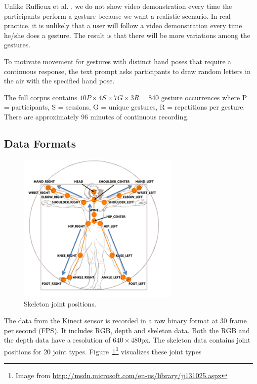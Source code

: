 Unlike Ruffieux et al. \cite{Ruffieux2013}, we do not show video demonstration
every time the participants perform a gesture because we want a
realistic scenario. In real practice, it is unlikely that a user will follow a
video demonstration every time he/she does a gesture. The result is that
there will be more variations among the gestures.

To motivate movement for gestures with distinct hand poses that
require a continuous response, the text prompt asks participants to draw
random letters in the air with the specified hand pose. 

The full corpus contains $
10P \times 4S \times 7G \times 3R = 840$ gesture occurrences
where P = participants, S = sessions, G = unique gestures, R = repetitions per
gesture. There are approximately 96 minutes of continuous recording.

\subsection{Data Formats}

\begin{figure}[tbh]
\centering
\includegraphics[width=0.7\textwidth]{figures/skeleton.png}
\caption{Skeleton joint positions.}
\label{fig:skeleton}
\end{figure}

The data from the Kinect sensor is recorded in a raw binary format at 30
frame per second (FPS). It includes RGB, depth and skeleton data. Both the RGB
and the depth data have a resolution of $640\times480$px. The skeleton data
contains joint positions for 20 joint types. Figure~\ref{fig:skeleton}\footnote{Image from
\url{http://msdn.microsoft.com/en-us/library/jj131025.aspx} } visualizes these
joint types

